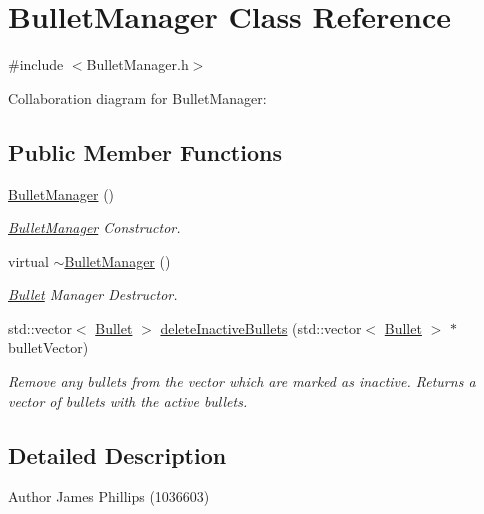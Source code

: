 \hypertarget{class_bullet_manager}{}\section{Bullet\+Manager Class Reference}
\label{class_bullet_manager}


{\ttfamily \#include $<$Bullet\+Manager.\+h$>$}



Collaboration diagram for Bullet\+Manager\+:
\subsection*{Public Member Functions}
\begin{DoxyCompactItemize}
\item 
\hyperlink{class_bullet_manager_a4aae3d492898b93dd5730dc28f2cc910}{Bullet\+Manager} ()
\begin{DoxyCompactList}\small\item\em \hyperlink{class_bullet_manager}{Bullet\+Manager} Constructor. \end{DoxyCompactList}\item 
virtual \hyperlink{class_bullet_manager_ae91d473833a2b3cc9bfb6180d3eb0099}{$\sim$\+Bullet\+Manager} ()
\begin{DoxyCompactList}\small\item\em \hyperlink{class_bullet}{Bullet} Manager Destructor. \end{DoxyCompactList}\item 
std\+::vector$<$ \hyperlink{class_bullet}{Bullet} $>$ \hyperlink{class_bullet_manager_a834ec287e01fc2ed7c5d3885e4b380c6}{delete\+Inactive\+Bullets} (std\+::vector$<$ \hyperlink{class_bullet}{Bullet} $>$ $\ast$bullet\+Vector)
\begin{DoxyCompactList}\small\item\em Remove any bullets from the vector which are marked as inactive. Returns a vector of bullets with the active bullets. \end{DoxyCompactList}\end{DoxyCompactItemize}


\subsection{Detailed Description}
\begin{DoxyAuthor}{Author}
James Phillips (1036603) 
\end{DoxyAuthor}


